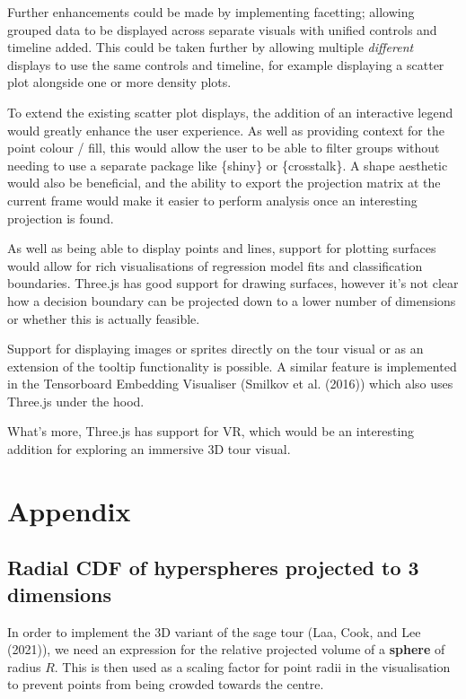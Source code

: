 Further enhancements could be made by implementing facetting; allowing grouped data to be displayed across separate visuals with unified controls and timeline added. This could be taken further by allowing multiple \emph{different} displays to use the same controls and timeline, for example displaying a scatter plot alongside one or more density plots.

To extend the existing scatter plot displays, the addition of an interactive legend would greatly enhance the user experience. As well as providing context for the point colour / fill, this would allow the user to be able to filter groups without needing to use a separate package like \{shiny\} or \{crosstalk\}. A shape aesthetic would also be beneficial, and the ability to export the projection matrix at the current frame would make it easier to perform analysis once an interesting projection is found.

As well as being able to display points and lines, support for plotting surfaces would allow for rich visualisations of regression model fits and classification boundaries. Three.js has good support for drawing surfaces, however it's not clear how a decision boundary can be projected down to a lower number of dimensions or whether this is actually feasible.

Support for displaying images or sprites directly on the tour visual or as an extension of the tooltip functionality is possible. A similar feature is implemented in the Tensorboard Embedding Visualiser (Smilkov et al. (2016)) which also uses Three.js under the hood.

What's more, Three.js has support for VR, which would be an interesting addition for exploring an immersive 3D tour visual.

\pagebreak

\hypertarget{appendix}{%
\section{Appendix}\label{appendix}}

\hypertarget{app:a}{%
\subsection{Radial CDF of hyperspheres projected to 3 dimensions}\label{app:a}}

In order to implement the 3D variant of the sage tour (Laa, Cook, and Lee (2021)), we need an expression for the relative projected volume of a \textbf{sphere} of radius \(R\). This is then used as a scaling factor for point radii in the visualisation to prevent points from being crowded towards the centre.

